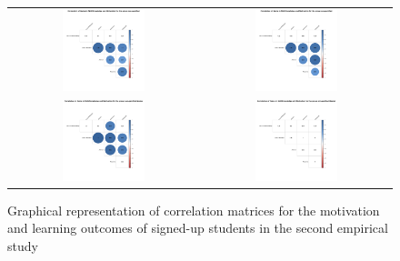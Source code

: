 
\begin{figure}[htb]
 \caption{Graphical representation of correlation matrices for the motivation and learning outcomes of signed-up students in the second empirical study}
 \label{fig:signedup-correlation-matrices-second-study}
 \centering
 \begin{tabular}{cc}
 \includegraphics[width=0.45\textwidth]{images/chap-evaluation/corr-signedup-second/non-gamified1.png}&
 \includegraphics[width=0.45\textwidth]{images/chap-evaluation/corr-signedup-second/ont-gamified1.png}\\
 \includegraphics[width=0.45\textwidth]{images/chap-evaluation/corr-signedup-second/non-gamifiedMaster1.png}&
 \includegraphics[width=0.45\textwidth]{images/chap-evaluation/corr-signedup-second/ont-gamifiedMaster1.png}\\

\end{tabular}
\end{figure}
